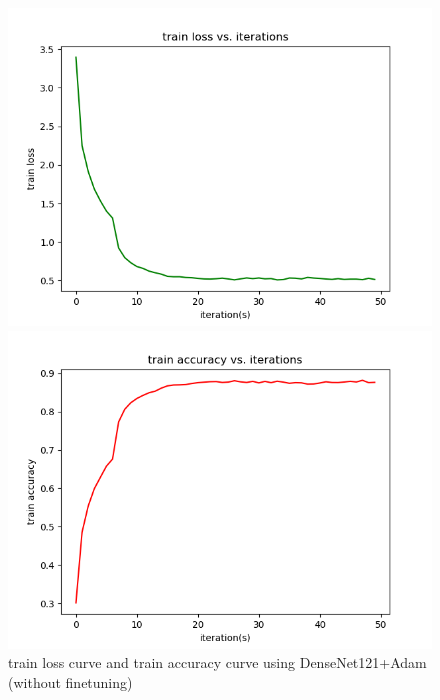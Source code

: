 \documentclass[cn]{elegantbook}
\begin{document}
\begin{figure}[!h]
	\centering
	\begin{minipage}[t]{0.48\textwidth}
		\centering
		\includegraphics[width=\textwidth]{../results/trainloss_den_adam}
	\end{minipage}
	\begin{minipage}[t]{0.48\textwidth}
		\centering
		\includegraphics[width=\textwidth]{../results/trainacc_den_adam}
	\end{minipage}
	\caption{\label{trainres_den_adam}train loss curve and train accuracy curve using DenseNet121+Adam (without finetuning)}
\end{figure}
\end{document}
